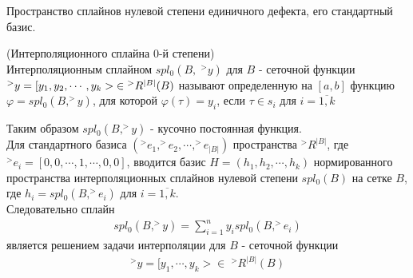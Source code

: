 \documentclass[__main__.tex]{subfiles}
\begin{document}
Пространство сплайнов нулевой степени единичного дефекта, его стандартный базис.\\

\begin{definition}
    (Интерполяционного сплайна 0-й степени)\\
    Интерполяционным сплайном $spl_0\left(B,\;^>y\right)$ для $B$ - сеточной функции $^{>}y = [y_1,y_2,\cdots, y_k>\; \in \\ ^{>}R^{|B|}(B)$ называют определенную на $[a,b]$ функцию $\varphi = spl_0\left(B,^{>}y\right)$, для которой $\varphi(\tau) = y_i$, если $\tau \in s_i$ для $i = \overline{1,k}$
\end{definition}
Таким образом $spl_0\left(B,^>y\right)$ - кусочно постоянная функция.\\ Для стандартного базиса $(^>e_1,^>e_2,\cdots,^>e_{|B|})$ пространства $^>R^{|B|}$, где $^>e_i = [0,0,\cdots,1,\cdots,0,0]$, вводится базис $H = (h_1,h_2,\cdots, h_k)$ нормированного пространства интерполяционных сплайнов нулевой степени $spl_0(B)$ на сетке $B$, где $h_i = spl_0\left(B,^>e_i\right)$ для $i=\overline{1,k}$.\\
Следовательно сплайн
\begin{gather*}
    spl_0\left(B,^>y\right) = \sum_{i=1}^{n}y_i spl_0\left(B,^>e_i\right)
\end{gather*}
является решением задачи интерполяции для $B$ - сеточной функции
\begin{gather*}
    ^>y = [y_1,\cdots,y_k> \in\;^>R^{|B|}(B)
\end{gather*}
\end{document}
